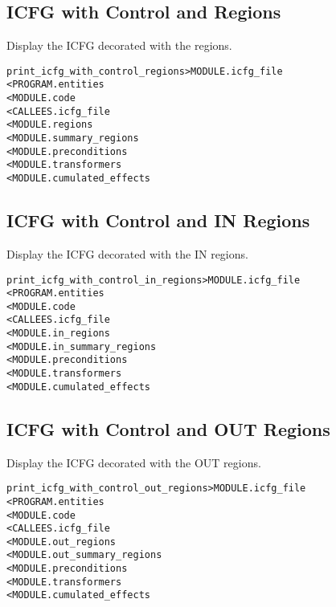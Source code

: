 \documentclass[a4paper]{report}
\newenvironment{PipsMake}{\begin{alltt}}{\end{alltt}}
\newenvironment{PipsPass}[1]{\label{pass:#1}}{}
\begin{document}
\subsection{ICFG with Control and Regions}

\begin{PipsPass}{print_icfg_with_control_regions}
Display the ICFG decorated with the regions.
\end{PipsPass}
\begin{PipsMake}
print_icfg_with_control_regions         > MODULE.icfg_file
        < PROGRAM.entities
        < MODULE.code
        < CALLEES.icfg_file
        < MODULE.regions
        < MODULE.summary_regions
        < MODULE.preconditions
        < MODULE.transformers
        < MODULE.cumulated_effects
\end{PipsMake}

\subsection{ICFG with Control and IN Regions}

\begin{PipsPass}{print_icfg_with_control_in_regions}
Display the ICFG decorated with the IN regions.
\end{PipsPass}
\begin{PipsMake}
print_icfg_with_control_in_regions      > MODULE.icfg_file
        < PROGRAM.entities
        < MODULE.code
        < CALLEES.icfg_file
        < MODULE.in_regions
        < MODULE.in_summary_regions
        < MODULE.preconditions
        < MODULE.transformers
        < MODULE.cumulated_effects
\end{PipsMake}

\subsection{ICFG with Control and OUT Regions}

\begin{PipsPass}{print_icfg_with_control_out_regions}
Display the ICFG decorated with the OUT regions.
\end{PipsPass}
\begin{PipsMake}
print_icfg_with_control_out_regions     > MODULE.icfg_file
        < PROGRAM.entities
        < MODULE.code
        < CALLEES.icfg_file
        < MODULE.out_regions
        < MODULE.out_summary_regions
        < MODULE.preconditions
        < MODULE.transformers
        < MODULE.cumulated_effects
\end{PipsMake}
\end{document}
